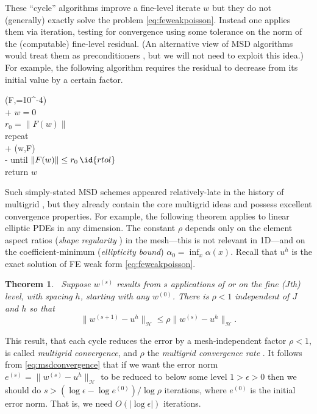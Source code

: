\documentclass[letterpaper,final,12pt,reqno]{amsart}
\theoremstyle{claim}
\newtheorem{theorem}{Theorem}
\newcommand{\eps}{\epsilon}
\numberwithin{equation}{section}
\numberwithin{figure}{section}
\numberwithin{table}{section}
\numberwithin{theorem}{section}
\begin{document}
These  ``cycle'' algorithms improve a fine-level iterate $w$ but they do not (generally) exactly solve the problem \eqref{eq:feweakpoisson}.  Instead one applies them via iteration, testing for convergence using some tolerance on the norm of the (computable) fine-level residual.  (An alternative view of MSD algorithms would treat them as preconditioners \cite[for example]{Bueler2021}, but we will not need to exploit this idea.)  For example, the following algorithm requires the residual to decrease from its initial value by a certain factor.
\begin{pseudo*} \label{ps:msd-solver}
(F,=10^{-4})\text{:} \\+
    $w=0$ \qquad\qquad\qquad\qquad\qquad {} \\
    $r_0 = \|F(w)\|$ \\
    repeat \\+
        (w,F) \qquad\qquad {} \\-
    until $\|F(w)\| \le r_0\, \id{rtol}$ \\
    return $w$
\end{pseudo*}

Such simply-stated MSD schemes appeared relatively-late in the history of multigrid \cite{Xu1992}, but they already contain the core multigrid ideas and possess excellent convergence properties.  For example, the following theorem applies to linear elliptic PDEs in any dimension.  The constant $\rho$ depends only on the element aspect ratios (\emph{shape regularity} \cite{Elmanetal2014}) in the mesh---this is not relevant in 1D---and on the coefficient-minimum (\emph{ellipticity bound}) $\alpha_0=\inf_x \alpha(x)$.  Recall that $u^h$ is the exact solution of FE weak form \eqref{eq:feweakpoisson}.

\begin{theorem} \cite[Thm.~3.10]{GraeserKornhuber2009}\,  \label{thm:msdconvergence}  Suppose $w^{(s)}$  results from $s$ applications of  or  on the fine ($J$th) level, with spacing $h$, starting with any $w^{(0)}$.  There is $\rho<1$ independent of $J$ and $h$ so that
\begin{equation}
  \|w^{(s+1)} - u^h\|_{\mathcal{H}} \le \rho \|w^{(s)} - u^h\|_{\mathcal{H}}.  \label{eq:msdconvergence}
\end{equation}
\end{theorem}

This result, that each cycle reduces the error by a mesh-independent factor $\rho<1$, is called \emph{multigrid convergence}, and $\rho$ the \emph{multigrid convergence rate} \cite{Braess2007}.  It follows from \eqref{eq:msdconvergence} that if we want the error norm $e^{(s)} = \|w^{(s)}-u^h\|_{\mathcal{H}}$ to be reduced to below some level $1>\eps>0$ then we should do $s>(\log\eps - \log e^{(0)})/\log \rho$ iterations, where $e^{(0)}$ is the initial error norm.  That is, we need $O(|\log\eps|)$ iterations.
\end{document}
